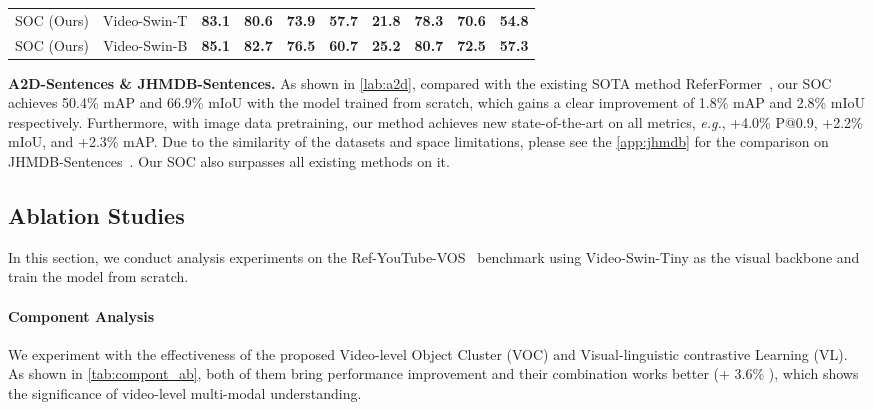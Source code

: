 \documentclass{article}
\begin{document}
\begin{table*}[t]
\begin{tabular}{l | c | c c c c c |c c | c }
\rowcolor{gray!10} SOC (Ours) & Video-Swin-T & \textbf{83.1} & \textbf{80.6} & \textbf{73.9} & \textbf{57.7} & \textbf{21.8}  & \textbf{78.3} & \textbf{70.6} & \textbf{54.8} \\
\rowcolor{gray!10} SOC (Ours) & Video-Swin-B & \textbf{85.1} & \textbf{82.7} & \textbf{76.5} & \textbf{60.7} & \textbf{25.2} &  \textbf{80.7} & \textbf{72.5} &\textbf{57.3} \\

\bottomrule

\end{tabular}
\caption{Comparison with the state-of-the-art methods on A2D-Sentences.}
\label{lab:a2d}
\end{table*}

\textbf{A2D-Sentences \& JHMDB-Sentences.}
As shown in \cref{lab:a2d}, compared with the existing SOTA method ReferFormer~\cite{referformer}, our SOC achieves 50.4\% mAP and 66.9\% mIoU with the model trained from scratch, which gains a clear improvement of 1.8\% mAP and 2.8\% mIoU respectively. Furthermore, with image data pretraining, our method achieves new state-of-the-art on all metrics, \textit{e.g.}, +4.0\% P@0.9, +2.2\% mIoU, and +2.3\% mAP.  Due to the similarity of the datasets and space limitations, please see the \cref{app:jhmdb} for the comparison on JHMDB-Sentences~\cite{GavrilyukGLS18}. Our SOC also surpasses all existing methods on it.

\vspace{-5pt}
\subsection{Ablation Studies}
In this section, we conduct analysis experiments on the Ref-YouTube-VOS~\cite{urvos} benchmark using Video-Swin-Tiny as the visual backbone and train the model from scratch.

\vspace{-5pt}
\paragraph{Component Analysis}
We experiment with the effectiveness of the proposed
Video-level Object Cluster (VOC) and Visual-linguistic contrastive Learning (VL). As shown in \cref{tab:compont_ab}, both of them bring
performance improvement and their combination works better (+ 3.6\% ), which shows the significance of video-level multi-modal understanding.
\end{document}
